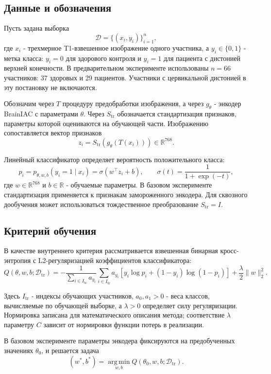 \documentclass[11pt,a4paper]{article}
\begin{document}
\subsection{Данные и обозначения}

Пусть задана выборка
\[
\mathcal{D}=\{(x_i,y_i)\}_{i=1}^{n},
\]
где \(x_i\) - трехмерное T1-взвешенное изображение одного участника, а \(y_i\in\{0,1\}\) - метка класса: \(y_i=0\) для здорового контроля и \(y_i=1\) для пациента с дистонией верхней конечности. В предварительном эксперименте использованы \(n=66\) участников: 37 здоровых и 29 пациентов. Участники с цервикальной дистонией в эту постановку не включаются.

Обозначим через \(T\) процедуру предобработки изображения, а через \(g_\theta\) - энкодер BrainIAC с параметрами \(\theta\). Через \(S_{\mathrm{tr}}\) обозначается стандартизация признаков, параметры которой оцениваются на обучающей части. Изображению сопоставляется вектор признаков
\[
z_i=S_{\mathrm{tr}}\!\left(g_\theta(T(x_i))\right)\in\mathbb{R}^{768}.
\]

Линейный классификатор определяет вероятность положительного класса:
\[
p_i=p_{\theta,w,b}(y_i=1\mid x_i)
=\sigma(w^\top z_i+b),
\qquad
\sigma(t)=\frac{1}{1+\exp(-t)},
\]
где \(w\in\mathbb{R}^{768}\) и \(b\in\mathbb{R}\) - обучаемые параметры. В базовом эксперименте стандартизация применяется к признакам замороженного энкодера. Для сквозного дообучения может использоваться тождественное преобразование \(S_{\mathrm{tr}}=I\).

\subsection{Критерий обучения}

В качестве внутреннего критерия рассматривается взвешенная бинарная кросс-энтропия с L2-регуляризацией коэффициентов классификатора:
\[
Q(\theta,w,b;\mathcal{D}_{\mathrm{tr}})
=
-\frac{1}{\sum_{i\in I_{\mathrm{tr}}}a_{y_i}}
\sum_{i\in I_{\mathrm{tr}}}
a_{y_i}
\left[
y_i\log p_i+(1-y_i)\log(1-p_i)
\right]
+\frac{\lambda}{2}\|w\|_2^2.
\]

Здесь \(I_{\mathrm{tr}}\) - индексы обучающих участников, \(a_0,a_1>0\) - веса классов, вычисляемые по обучающей выборке, а \(\lambda>0\) определяет силу регуляризации. Нормировка записана для математического описания метода; соответствие \(\lambda\) параметру \(C\) зависит от нормировки функции потерь в реализации.

В базовом эксперименте параметры энкодера фиксируются на предобученных значениях \(\theta_0\), и решается задача
\[
(w^*,b^*)=
\operatorname*{arg\,min}_{w,b}
Q(\theta_0,w,b;\mathcal{D}_{\mathrm{tr}}).
\]
\end{document}
